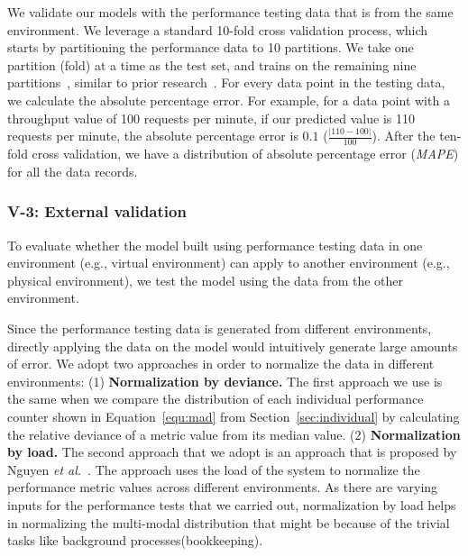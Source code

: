 We validate our models with the performance testing data that is from the same environment. We leverage a standard 10-fold cross validation process, which starts by partitioning the performance data to 10 partitions. We take one partition (fold) at a time as the test set, and trains on the remaining nine partitions~\cite{10foldcross,kohavi1995study}, similar to prior research~\cite{haroon}. For every data point in the testing data, we calculate the absolute percentage error. For example, for a data point with a throughput value of 100 requests per minute, if our predicted value is 110 requests per minute, the absolute percentage error is $0.1$ ($\frac{|110-100|}{100}$). After the ten-fold cross validation, we have a distribution of absolute percentage error (\textit{MAPE}) for all the data records.



\subsubsection{V-3: External validation}
To evaluate whether the model built using performance testing data in one environment (e.g., virtual environment) can apply to another environment (e.g., physical environment), we test the model using the data from the other environment.

Since the performance testing data is generated from different environments, directly applying the data on the model would intuitively generate large amounts of error. We adopt two approaches in order to normalize the data in different environments: (1) \textbf{Normalization by deviance.} The first approach we use is the same when we compare the distribution of each individual performance counter shown in Equation~\ref{equ:mad} from Section~\ref{sec:individual} by calculating the relative deviance of a metric value from its median value. (2) \textbf{Normalization by load.} The second approach that we adopt is an approach that is proposed by Nguyen \textit{et al.}~\cite{Nguyen:2012:ADP:2188286.2188344}. The approach uses the load of the system to normalize the performance metric values across different environments. As there are varying inputs for the performance tests that we carried out, normalization by load helps in normalizing the multi-modal distribution that might be because of the trivial tasks like background processes(bookkeeping).

